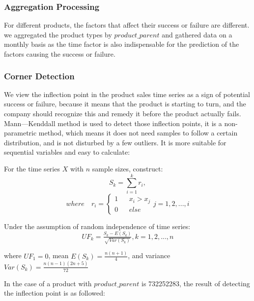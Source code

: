 \documentclass{mcmthesis}
\begin{document}
\subsubsection{Aggregation Processing}

\quad \quad For different products, the factors that affect their success or failure are different. we aggregated the product types by $product\_parent$ and gathered data on a monthly basis as the time factor is also indispensable for the prediction of the factors causing the success or failure.

\subsubsection{Corner Detection}

\quad \quad We view the inflection point in the product sales time series as a sign of potential success or failure, because it means that the product is starting to turn, and the company should recognize this and remedy it before the product actually fails. Mann—Kenddall method is used to detect those inflection points, it is a non-parametric method, which means it does not need samples to follow a certain distribution, and is not disturbed by a few outliers. It is more suitable for sequential variables and easy to calculate:

For the time series $X$ with $n$ sample sizes, construct:
\begin{equation}
    S_k= \sum_{i=1}^kr_i, 
\end{equation}
\begin{equation}
    where \quad r_i=\left\{
\begin{array}{rcl}
1     &      & {x_i > x_j}\\
0     &      & else
\end{array} \right.        j=1,2,...,i 
\end{equation}

Under the assumption of random independence of time series:
\begin{equation}
     UF_k=\tfrac{S_k-E(S_k)}{\sqrt{Var(S_k)}} ,k=1,2,...,n 
\end{equation}

where $UF_1=0$, mean $E(S_k)=\tfrac{n(n+1)}{4}$, and variance $Var(S_k)=\tfrac{n(n-1)(2n+5)}{72}$

In the case of a product with $product\_parent$ is 732252283, the result of detecting the inflection point is as followed:
\end{document}
